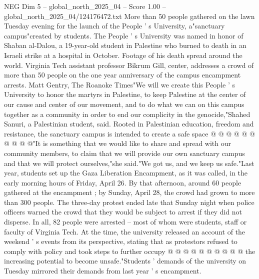 \begin{textsample}{NEG Dim 5 – global\_north\_2025\_04 – Score 1.00 – global\_north\_2025\_04/124176472.txt}  \label{ex:f5_neg_366}
More than 50 people gathered on the lawn Tuesday evening for the launch of the People ' s University, a"sanctuary campus"created by students.
The People ' s University was named in honor of Shaban al-Dalou, a 19-year-old student in Palestine who burned to death in an Israeli strike at a hospital in October.
Footage of his death spread around the world.
Virginia Tech assistant professor Bikrum Gill, center, addresses a crowd of more than 50 people on the one year anniversary of the campus encampment arrests.
Matt Gentry, The Roanoke Times"We will we create this People ' s University to honor the martyrs in Palestine, to keep Palestine at the center of our cause and center of our movement, and to do what we can on this campus together as a community in order to end our complicity in the genocide,"Shahed Sanuri, a Palestinian student, said.
Rooted in Palestinian education, freedom and resistance, the sanctuary campus is intended to create a safe space @ @ @ @ @ @ @ @ @ @"It is something that we would like to share and spread with our community members, to claim that we will provide our own sanctuary campus and that we will protect ourselves,"she said."We got us, and we keep us safe."Last year, students set up the Gaza Liberation Encampment, as it was called, in the early morning hours of Friday, April 26.
By that afternoon, around 60 people gathered at the encampment ; by Sunday, April 28, the crowd had grown to more than 300 people.
The three-day protest ended late that Sunday night when police officers warned the crowd that they would be subject to arrest if they did not disperse.
In all, 82 people were arrested -- most of whom were students, staff or faculty of Virginia Tech.
At the time, the university released an account of the weekend ' s events from its perspective, stating that as protestors refused to comply with policy and took steps to further occupy @ @ @ @ @ @ @ @ @ @ the increasing potential to become unsafe."Students ' demands of the university on Tuesday mirrored their demands from last year ' s encampment.

\end{textsample}

